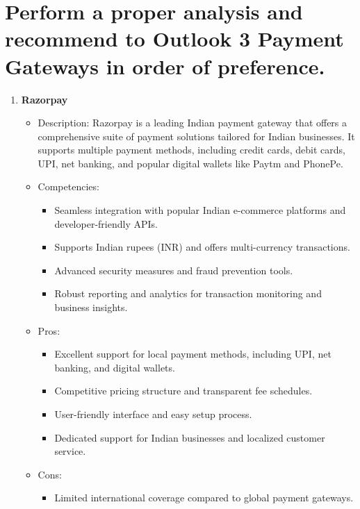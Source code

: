 \section{Perform a proper analysis and recommend to Outlook 3 Payment Gateways in order of preference.}
\begin{enumerate}
    \item \textbf{Razorpay}
\begin{itemize}
  \item Description: Razorpay is a leading Indian payment gateway that offers a comprehensive suite of payment solutions tailored for Indian businesses. It supports multiple payment methods, including credit cards, debit cards, UPI, net banking, and popular digital wallets like Paytm and PhonePe.
  \item Competencies:
    \begin{itemize}
      \item Seamless integration with popular Indian e-commerce platforms and developer-friendly APIs.
      \item Supports Indian rupees (INR) and offers multi-currency transactions.
      \item Advanced security measures and fraud prevention tools.
      \item Robust reporting and analytics for transaction monitoring and business insights.
    \end{itemize}
  \item Pros:
    \begin{itemize}
      \item Excellent support for local payment methods, including UPI, net banking, and digital wallets.
      \item Competitive pricing structure and transparent fee schedules.
      \item User-friendly interface and easy setup process.
      \item Dedicated support for Indian businesses and localized customer service.
    \end{itemize}
  \item Cons:
    \begin{itemize}
      \item Limited international coverage compared to global payment gateways.
    \end{itemize}
\end{itemize}


\end{enumerate}

